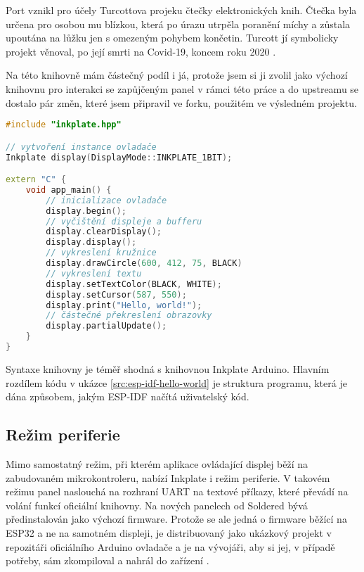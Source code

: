 Port vznikl pro účely Turcottova projeku čtečky elektronických knih. Čtečka byla určena pro osobou mu blízkou, která po úrazu utrpěla poranění míchy a zůstala upoutána na lůžku jen s omezeným pohybem končetin. Turcott jí symbolicky projekt věnoval, po její smrti na Covid-19, koncem roku 2020 \cite{turcotteTurgu1EPubInkPlate2024}.

Na této knihovně mám částečný podíl i já, protože jsem si ji zvolil jako výchozí knihovnu pro interakci se zapůjčeným panel v rámci této práce a do upstreamu se dostalo pár změn, které jsem připravil ve forku, použitém ve výsledném projektu.

\begin{lstlisting}[label=src:esp-idf-hello-world,language=C++,caption={Ilustrační použití knihovny Inkplate ESP-IDF}]
#include "inkplate.hpp"

// vytvoření instance ovladače
Inkplate display(DisplayMode::INKPLATE_1BIT);

extern "C" {
    void app_main() {
        // inicializace ovladače
        display.begin();
        // vyčištění displeje a bufferu
        display.clearDisplay();
        display.display();
        // vykreslení kružnice
        display.drawCircle(600, 412, 75, BLACK)
        // vykreslení textu
        display.setTextColor(BLACK, WHITE);
        display.setCursor(587, 550);
        display.print("Hello, world!");
        // částečné překreslení obrazovky
        display.partialUpdate();
    }
}
\end{lstlisting}

Syntaxe knihovny je téměř shodná s knihovnou Inkplate Arduino. Hlavním rozdílem kódu v ukázce \ref{src:esp-idf-hello-world} je struktura programu, která je dána způsobem, jakým ESP-IDF načítá uživatelský kód.

\subsection{Režim periferie}
Mimo samostatný režim, při kterém aplikace ovládající displej běží na zabudovaném mikrokontroleru, nabízí Inkplate i režim periferie. V takovém režimu panel naslouchá na rozhraní UART na textové příkazy, které převádí na volání funkcí oficiální knihovny. Na nových panelech od Soldered bývá předinstalován jako výchozí firmware. Protože se ale jedná o firmware běžící na ESP32 a ne na samotném displeji, je distribuovaný jako ukázkový projekt v repozitáři oficiálního Arduino ovladače a je na vývojáři, aby si jej, v případě potřeby, sám zkompiloval a nahrál do zařízení \cite{SolderedElectronicsInkplatePeripheralModeRaspberryPiExample2023}.

